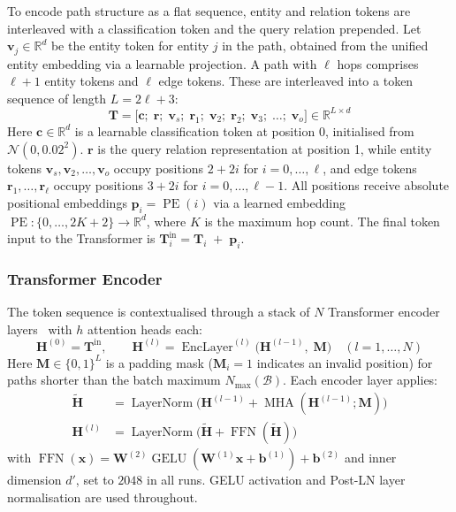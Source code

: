 \documentclass[runningheads]{llncs}
\begin{document}
To encode path structure as a flat sequence, entity and relation tokens are interleaved
with a classification token and the query relation prepended.
Let $\mathbf{v}_j \in \mathbb{R}^{d}$ be the entity token for entity $j$ in the path,
obtained from the unified entity embedding via a learnable projection.
A path with $\ell$ hops comprises $\ell+1$ entity tokens and $\ell$ edge tokens.
These are interleaved into a token sequence of length $L = 2\ell + 3$:
\begin{equation}
  \mathbf{T} = \bigl[\mathbf{c};\; \mathbf{r};\;
    \mathbf{v}_{s};\; \mathbf{r}_{1};\; \mathbf{v}_{2};\; \mathbf{r}_{2};\;
  \mathbf{v}_{3};\; \ldots;\; \mathbf{v}_{o}\bigr]
  \in \mathbb{R}^{L \times d}
  \label{eq:token-seq}
\end{equation}
Here $\mathbf{c} \in \mathbb{R}^{d}$ is a learnable classification token
at position 0, initialised from $\mathcal{N}(0, 0.02^2)$.
$\mathbf{r}$ is the query relation representation at position 1, while entity tokens
$\mathbf{v}_{s}, \mathbf{v}_{2}, \ldots, \mathbf{v}_{o}$ occupy positions $2 + 2i$
for $i = 0, \ldots, \ell$, and edge tokens $\mathbf{r}_{1}, \ldots, \mathbf{r}_{\ell}$
occupy positions $3 + 2i$ for $i = 0, \ldots, \ell - 1$.
All positions receive absolute positional embeddings
$\mathbf{p}_i = \operatorname{PE}(i)$ via a learned embedding
$\operatorname{PE}: \{0, \ldots, 2K+2\} \to \mathbb{R}^{d}$,
where $K$ is the maximum hop count.
The final token input to the Transformer is $\mathbf{T}^{\text{in}}_i = \mathbf{T}_i \;+\; \mathbf{p}_i$.
\subsubsection{Transformer Encoder}

\label{sec:transformer-encoder}

The token sequence is contextualised through a stack of $N$
Transformer encoder layers~\cite{vaswani2017attention} with $h$ attention heads each:
\begin{equation}
  \mathbf{H}^{(0)} = \mathbf{T}^{\text{in}},\qquad
  \mathbf{H}^{(l)} = \operatorname{EncLayer}^{(l)}\bigl(\mathbf{H}^{(l-1)},\; \mathbf{M}\bigr)
  \quad (l = 1, \ldots, N)
  \label{eq:transformer}
\end{equation}
Here $\mathbf{M} \in \{0, 1\}^{L}$ is a padding mask ($\mathbf{M}_i = 1$ indicates an
invalid position) for paths shorter than the batch maximum $N_{\max}(\mathcal{B})$.
Each encoder layer applies:
\begin{align}
  \tilde{\mathbf{H}} &= \operatorname{LayerNorm}\bigl(
  \mathbf{H}^{(l-1)} + \operatorname{MHA}(\mathbf{H}^{(l-1)}; \mathbf{M})\bigr)
  \label{eq:attn}\\
  \mathbf{H}^{(l)} &= \operatorname{LayerNorm}\bigl(
  \tilde{\mathbf{H}} + \operatorname{FFN}(\tilde{\mathbf{H}})\bigr)
  \label{eq:ffn}
\end{align}
with $\operatorname{FFN}(\mathbf{x}) = \mathbf{W}^{(2)} \operatorname{GELU}(\mathbf{W}^{(1)} \mathbf{x} + \mathbf{b}^{(1)}) + \mathbf{b}^{(2)}$
and inner dimension $d'$, set to $2048$ in all runs.
GELU \cite{hendrycks2016gaussian} activation
and Post-LN layer normalisation are used throughout.
\end{document}
